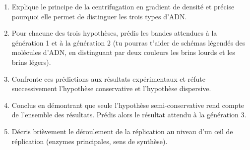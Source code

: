 \documentclass[11pt]{article}
\begin{document}
\begin{exercice}
\begin{enumerate}
\item Explique le principe de la centrifugation en gradient de densité et précise pourquoi elle permet de distinguer les trois types d'ADN.
\item Pour chacune des trois hypothèses, prédis les bandes attendues à la génération 1 et à la génération 2 (tu pourras t'aider de schémas légendés des molécules d'ADN, en distinguant par deux couleurs les brins lourds et les brins légers).
\item Confronte ces prédictions aux résultats expérimentaux et réfute successivement l'hypothèse conservative et l'hypothèse dispersive.
\item Conclus en démontrant que seule l'hypothèse semi-conservative rend compte de l'ensemble des résultats. Prédis alors le résultat attendu à la génération 3.
\item Décris brièvement le déroulement de la réplication au niveau d'un œil de réplication (enzymes principales, sens de synthèse).
\end{enumerate}
\end{exercice}
\end{document}
